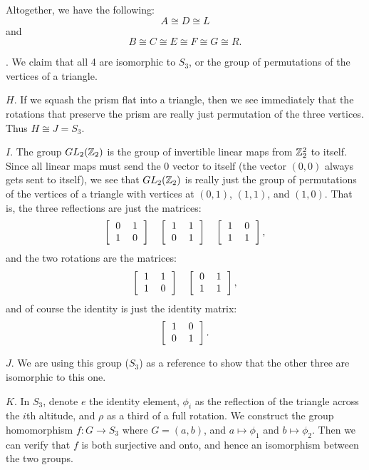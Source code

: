 Altogether, we have the following:
\[
A \cong D \cong L
\]
and 
\[
B \cong C \cong E \cong F \cong G \cong R.
\]

. We claim that all 4 are isomorphic to $S_3$, or the group of permutations of the vertices of a triangle.

$H$. If we squash the prism flat into a triangle, then we see immediately that the rotations that preserve the prism are really just permutation of the three vertices. Thus $H \cong J = S_3$.

$I$. The group $GL_2(\mathbb{Z}_2)$ is the group of invertible linear maps from $\mathbb{Z}_2^2$ to itself. Since all linear maps must send the 0 vector to itself (the vector $(0,0)$ always gets sent to itself), we see that $GL_2(\mathbb{Z}_2)$ is really just the group of permutations of the vertices of a triangle with vertices at $(0,1)$, $(1,1)$, and $(1,0)$. That is, the three reflections are just the matrices:
\[
\left[\begin{tabular}{cc} 0 & 1 \\ 1 & 0 \end{tabular}\right] \quad
\left[\begin{tabular}{cc} 1 & 1 \\ 0 & 1 \end{tabular}\right] \quad
\left[\begin{tabular}{cc} 1 & 0 \\ 1 & 1 \end{tabular}\right],
\]
and the two rotations are the matrices:
\[
\left[\begin{tabular}{cc} 1 & 1 \\ 1 & 0 \end{tabular}\right] \quad
\left[\begin{tabular}{cc} 0 & 1 \\ 1 & 1 \end{tabular}\right],
\]
and of course the identity is just the identity matrix:
\[
\left[\begin{tabular}{cc} 1 & 0 \\ 0 & 1 \end{tabular}\right].
\]

$J$. We are using this group ($S_3$) as a reference to show that the other three are isomorphic to this one.

$K$. In $S_3$, denote $e$ the identity element, $\phi_i$ as the reflection of the triangle across the $i$th altitude, and $\rho$ as a third of a full rotation. We construct the group homomorphism $f: G \to S_3$ where $G = (a,b)$, and $a \mapsto \phi_1$ and $b \mapsto \phi_2$. Then we can verify that $f$ is both surjective and onto, and hence an isomorphism between the two groups.

